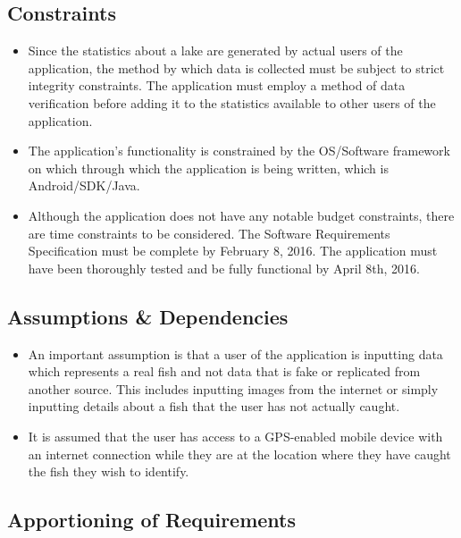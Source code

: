 \documentclass{article}
\begin{document}
\subsection{Constraints}
\begin{itemize}
	\item
	Since the statistics about a lake are generated by actual users of the application, the method by which data is collected must be subject to strict integrity constraints. The application must employ a method of data verification before adding it to the statistics available to other users of the application. 

	\item
	The application's functionality is constrained by the OS/Software framework on which through which the application is being written, which is Android/SDK/Java.

	\item
	Although the application does not have any notable budget constraints, there are time constraints to be considered. The Software Requirements Specification must be complete by February 8, 2016. The application must have been thoroughly tested and be fully functional by April 8th, 2016.
\end{itemize}

\subsection{Assumptions \& Dependencies}
\begin{itemize}
	\item
	An important assumption is that a user of the application is inputting data which represents a real fish and not data that is fake or replicated from another source. This includes inputting images from the internet or simply inputting details about a fish that the user has not actually caught.
	
	\item
	It is assumed that the user has access to a GPS-enabled mobile device with an internet connection while they are at the location where they have caught the fish they wish to identify.
\end{itemize}

\subsection{Apportioning of Requirements}

\iffalse
Have not determined yet whether there are requirements that we be delayed until the future.
\fi
\end{document}
